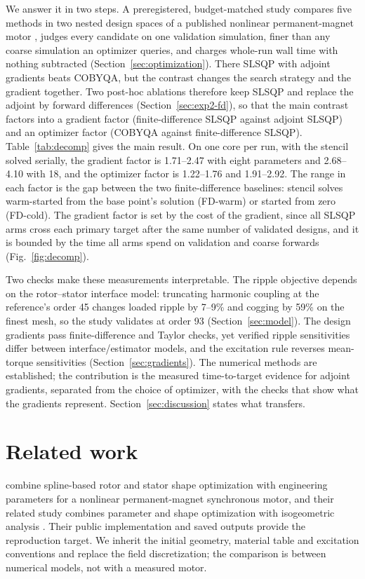 \documentclass{anvil-paper}
\begin{document}
We answer it in two steps. A preregistered, budget-matched study compares
five methods in two nested design spaces of a published nonlinear
permanent-magnet motor \citep{wiesheu2024spline}, judges every candidate
on one validation simulation, finer than any coarse simulation an optimizer
queries, and charges
whole-run wall time with nothing subtracted (Section~\ref{sec:optimization}).
There SLSQP with adjoint gradients beats COBYQA, but the contrast changes
the search strategy and the gradient together. Two post-hoc ablations
therefore keep SLSQP and replace the adjoint by forward differences
(Section~\ref{sec:exp2-fd}), so that the main contrast factors into a
gradient factor (finite-difference SLSQP against adjoint SLSQP) and an
optimizer factor (COBYQA against finite-difference SLSQP).
Table~\ref{tab:decomp} gives the main result. On one core per run, with the
stencil solved serially, the gradient factor is 1.71--2.47 with eight
parameters and 2.68--4.10 with 18, and the optimizer factor is
1.22--1.76 and 1.91--2.92. The range in each factor is the gap between the
two finite-difference baselines: stencil solves warm-started from the base
point's solution (FD-warm) or started from zero (FD-cold). The gradient
factor is set by the cost of the gradient, since all SLSQP arms cross each
primary target after the same number of validated designs, and it is
bounded by the time all arms spend on validation and coarse forwards
(Fig.~\ref{fig:decomp}).

Two checks make these measurements interpretable. The ripple objective
depends on the rotor--stator interface model: truncating harmonic coupling
at the reference's order 45 changes loaded ripple by 7--9\% and cogging by
59\% on the finest mesh, so the study validates at order 93
(Section~\ref{sec:model}). The design gradients pass finite-difference and
Taylor checks, yet verified ripple sensitivities differ between
interface/estimator models, and the excitation rule reverses mean-torque
sensitivities (Section~\ref{sec:gradients}). The numerical methods are
established; the contribution is the measured time-to-target evidence for
adjoint gradients, separated from the choice of optimizer, with the checks
that show what the gradients represent. Section~\ref{sec:discussion} states
what transfers.

\section{Related work}
\citet{wiesheu2024spline} combine spline-based rotor and stator shape
optimization with engineering parameters for a nonlinear permanent-magnet
synchronous motor, and their related study combines parameter and shape
optimization with isogeometric analysis \citep{wiesheu2025combined}. Their
public implementation and saved outputs provide the reproduction target.
We inherit the initial geometry, material table and excitation
conventions and replace the field discretization; the comparison is
between numerical models, not with a measured motor.
\end{document}
